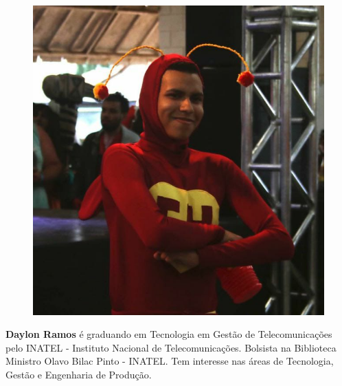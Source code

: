 \begin{figure}
\includegraphics[width=\linewidth]{figuras/autor2.png}  
\end{figure}

   \textbf{Daylon Ramos} é graduando em Tecnologia em Gestão de Telecomunicações pelo INATEL - Instituto Nacional de Telecomunicações. Bolsista na Biblioteca Ministro Olavo Bilac Pinto - INATEL. Tem interesse nas áreas de Tecnologia, Gestão e Engenharia de Produção.
